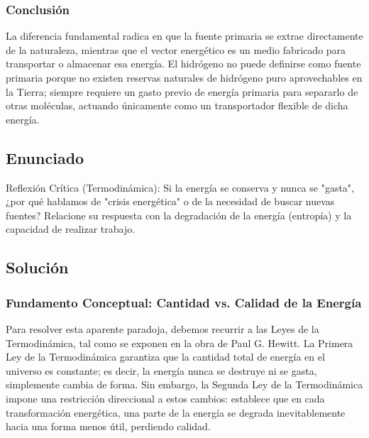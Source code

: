 \documentclass[12pt,a4paper]{article}
\begin{document}
\subsubsection*{Conclusión}
La diferencia fundamental radica en que la fuente primaria se extrae directamente de la naturaleza, mientras que el vector energético es un medio fabricado para transportar o almacenar esa energía. El hidrógeno no puede definirse como fuente primaria porque no existen reservas naturales de hidrógeno puro aprovechables en la Tierra; siempre requiere un gasto previo de energía primaria para separarlo de otras moléculas, actuando únicamente como un transportador flexible de dicha energía.

\newpage

\subsection*{Enunciado}
Reflexión Crítica (Termodinámica): Si la energía se conserva y nunca se "gasta", ¿por qué hablamos de "crisis energética" o de la necesidad de buscar nuevas fuentes? Relacione su respuesta con la degradación de la energía (entropía) y la capacidad de realizar trabajo.

\subsection*{Solución}

\subsubsection*{Fundamento Conceptual: Cantidad vs. Calidad de la Energía}
Para resolver esta aparente paradoja, debemos recurrir a las Leyes de la Termodinámica, tal como se exponen en la obra de Paul G. Hewitt. La Primera Ley de la Termodinámica garantiza que la cantidad total de energía en el universo es constante; es decir, la energía nunca se destruye ni se gasta, simplemente cambia de forma. Sin embargo, la Segunda Ley de la Termodinámica impone una restricción direccional a estos cambios: establece que en cada transformación energética, una parte de la energía se degrada inevitablemente hacia una forma menos útil, perdiendo calidad.
\end{document}
